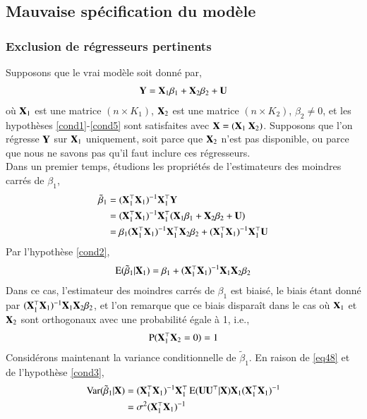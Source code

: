 \documentclass[10pt, reqno]{amsart}
\begin{document}
\subsection{Mauvaise spécification du modèle}
\subsubsection*{Exclusion de régresseurs pertinents}
Supposons que le vrai modèle soit donné par,
\begin{align}
\mathbf Y = \mathbf X_1\beta_1 + \mathbf X_2\beta_2 + \mathbf U
\label{eq49}
\end{align}
où $\mathbf X_1$ est une matrice $(n\times K_1)$, $\mathbf X_2$ est une matrice $(n\times K_2)$, $\beta_2\neq 0$, et les hypothèses \ref{cond1}-\ref{cond5} sont satisfaites avec $\boldX = (\boldX_1 \ \boldX_2)$. Supposons que l'on régresse $\mathbf Y$ sur $\mathbf X_1$ uniquement, soit parce que $\mathbf X_2$ n'est pas disponible, ou parce que nous ne savons pas qu'il faut inclure ces régresseurs.\\
Dans un premier temps, étudions les propriétés de l'estimateurs des moindres carrés de $\beta_1$,
\begin{align*}
\tilde{\beta}_1 &= (\mathbf X_1^\top\mathbf X_1)^{-1}\mathbf X_1^\top\mathbf Y\\
&= (\mathbf X_1^\top\mathbf X_1)^{-1}\mathbf X_1^\top(\mathbf X_1\beta_1 + \mathbf X_2\beta_2+\mathbf U)\\
&=\beta_1(\mathbf X_1^\top\mathbf X_1)^{-1}\mathbf X_1^\top\mathbf X_2\beta_2 + 
(\mathbf X_1^\top\mathbf X_1)^{-1}\mathbf X_1^\top\mathbf U
\end{align*}
Par l'hypothèse \ref{cond2},
\begin{align}
\operatorname{E}(\tilde{\beta}_1 | \mathbf X_1) = \beta_1 + (\mathbf X_1^\top\mathbf X_1)^{-1}\mathbf X_1\mathbf X_2\beta_2
\label{eq48}
\end{align}
Dans ce cas, l'estimateur des moindres carrés de $\beta_1$ est biaisé, le biais étant donné par $(\mathbf X_1^\top\mathbf X_1)^{-1}\mathbf X_1\mathbf X_2\beta_2$, et l'on remarque que ce biais disparaît dans le cas où $\mathbf X_1$ et $\mathbf X_2$ sont orthogonaux avec une probabilité égale à 1, i.e.,
\begin{align*}
\operatorname{P}(\mathbf X_1^\top\mathbf X_2 = 0) = 1
\end{align*}
Considérons maintenant la variance conditionnelle de $\tilde{\beta}_1$. En raison de \eqref{eq48} et de l'hypothèse \ref{cond3},
\begin{align*}
\operatorname{Var}(\tilde{\beta}_1 | \mathbf X) & = (\mathbf X_1^\top\mathbf X_1)^{-1}\mathbf X_1^\top\operatorname{E}(\mathbf U\mathbf U^\top|\mathbf X)\mathbf X_1(\mathbf X_1^\top\mathbf X_1)^{-1}\\
&=\sigma^2(\mathbf X_1^\top\mathbf X_1)^{-1}
\end{align*}
\end{document}
